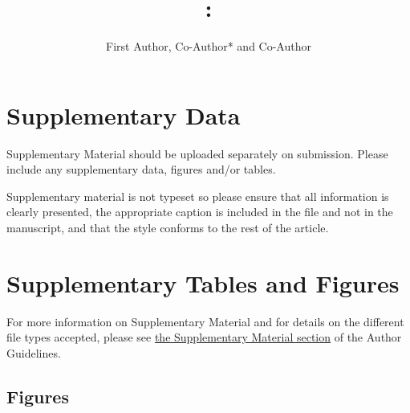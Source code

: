 \documentclass[utf8]{frontiers_suppmat} %
\def\firstAuthorLast{Frontiers}
\def\Authors{First Author, Co-Author* and Co-Author}
\begin{document}
\onecolumn
{}

\title[Supplementary Material]{{}:
\\ } %

\author[\firstAuthorLast ]{\Authors} %
\correspondance{} %

\extraAuth{}%

\maketitle


\section{Supplementary Data}

Supplementary Material should be uploaded separately on submission. Please include any supplementary data, figures and/or tables. 

Supplementary material is not typeset so please ensure that all information is clearly presented, the appropriate caption is included in the file and not in the manuscript, and that the style conforms to the rest of the article. 

\section{Supplementary Tables and Figures}

For more information on Supplementary Material and for details on the different file types accepted, please see  \href{http://home.frontiersin.org/about/author-guidelines#SupplementaryMaterial}{the Supplementary Material section}  of the Author Guidelines.


\subsection{Figures}

\end{document}
